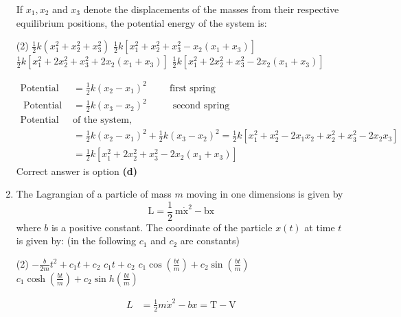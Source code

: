\begin{enumerate}
	If $x_{1}, x_{2}$ and $x_{3}$ denote the displacements of the masses from their respective equilibrium positions, the potential energy of the system is:
	 \begin{tasks}(2)
		\task[\textbf{a.}]$\frac{1}{2} k\left(x_{1}^{2}+x_{2}^{2}+x_{3}^{2}\right)$
		\task[\textbf{b.}]$\frac{1}{2} k\left[x_{1}^{2}+x_{2}^{2}+x_{3}^{2}-x_{2}\left(x_{1}+x_{3}\right)\right]$
		\task[\textbf{c.}]$\frac{1}{2} k\left[x_{1}^{2}+2 x_{2}^{2}+x_{3}^{2}+2 x_{2}\left(x_{1}+x_{3}\right)\right]$
		\task[\textbf{d.}] $\frac{1}{2} k\left[x_{1}^{2}+2 x_{2}^{2}+x_{3}^{2}-2 x_{2}\left(x_{1}+x_{3}\right)\right]$
	\end{tasks}
	\begin{answer}
		\begin{align*}
		\text{Potential energy }&=\frac{1}{2} k\left(x_{2}-x_{1}\right)^{2}\hspace{1cm}
		\text{first spring}\\
	\text{	Potential energy }&=\frac{1}{2} k\left(x_{3}-x_{2}\right)^{2}\hspace{1cm}
	\text{	second spring}\\
	\text{Potential energy }&\text{of the system,}\\
	&=\frac{1}{2} k\left(x_{2}-x_{1}\right)^{2}+\frac{1}{2} k\left(x_{3}-x_{2}\right)^{2}=\frac{1}{2} k\left[x_{1}^{2}+x_{2}^{2}-2 x_{1} x_{2}+x_{2}^{2}+x_{3}^{2}-2 x_{2} x_{3}\right]\\
	&=\frac{1}{2} k\left[x_{1}^{2}+2 x_{2}^{2}+x_{3}^{2}-2 x_{2}\left(x_{1}+x_{3}\right)\right]
		\end{align*}
		Correct answer is option \textbf{(d)}
	\end{answer}
	\item The Lagrangian of a particle of mass $m$ moving in one dimensions is given by
	$$
	\mathrm{L}=\frac{1}{2} \mathrm{~m} \dot{\mathrm{x}}^{2}-\mathrm{bx}
	$$
	where $b$ is a positive constant. The coordinate of the particle $x(t)$ at time $t$ is given by: (in the following $c_{1}$ and $c_{2}$ are constants)
	 \begin{tasks}(2)
		\task[\textbf{a.}]$-\frac{b}{2 m} t^{2}+c_{1} t+c_{2}$
		\task[\textbf{b.}]$c_{1} t+c_{2}$
		\task[\textbf{c.}]$c_{1} \cos \left(\frac{b t}{m}\right)+c_{2} \sin \left(\frac{b t}{m}\right)$
		\task[\textbf{d.}] $c_{1} \cosh \left(\frac{b t}{m}\right)+c_{2} \sin h\left(\frac{b t}{m}\right)$
	\end{tasks}
	\begin{answer}
		\begin{align*}
		L&=\frac{1}{2} m \dot{x}^{2}-b x=\mathrm{T}-\mathrm{V}\\

\end{align*}
\end{answer}
\end{enumerate}
